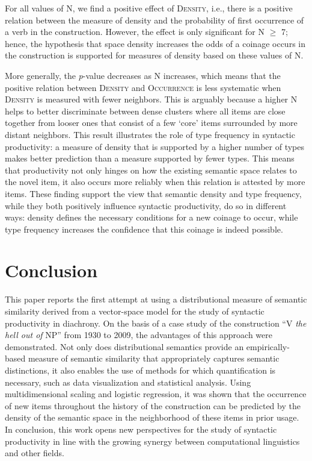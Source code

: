 \documentclass[11pt]{article}
\begin{document}
For all values of N, we find a positive effect of \textsc{Density}, i.e., there is a positive relation between the measure of density and the probability of first occurrence of a verb in the construction. However, the effect is only significant for N $\geq$ 7; hence, the hypothesis that space density increases the odds of a coinage occurs in the construction is supported for measures of density based on these values of N.

More generally, the \textit{p}-value decreases as N increases, which means that the positive relation between \textsc{Density} and \textsc{Occurrence} is less systematic when \textsc{Density} is measured with fewer neighbors. This is arguably because a higher N helps to better discriminate between dense clusters where all items are close together from looser ones that consist of a few `core' items surrounded by more distant neighbors. This result illustrates the role of type frequency in syntactic productivity: a measure of density that is supported by a higher number of types makes better prediction than a measure supported by fewer types. This means that productivity not only hinges on how the existing semantic space relates to the novel item, it also occurs more reliably when this relation is attested by more items. These finding support the view that semantic density and type frequency, while they both positively influence syntactic productivity, do so in different ways: density defines the necessary conditions for a new coinage to occur, while type frequency increases the confidence that this coinage is indeed possible.

\section{Conclusion}

This paper reports the first attempt at using a distributional measure of semantic similarity derived from a vector-space model for the study of syntactic productivity in diachrony. On the basis of a case study of the construction ``V \textit{the hell out of} NP'' from 1930 to 2009, the advantages of this approach were demonstrated. Not only does distributional semantics provide an empirically-based measure of semantic similarity that appropriately captures semantic distinctions, it also enables the use of methods for which quantification is necessary, such as data visualization and statistical analysis. Using multidimensional scaling and logistic regression, it was shown that the occurrence of new items throughout the history of the construction can be predicted by the density of the semantic space in the neighborhood of these items in prior usage. In conclusion, this work opens new perspectives for the study of syntactic productivity in line with the growing synergy between computational linguistics and other fields.
\end{document}
